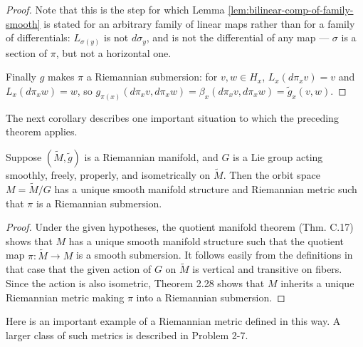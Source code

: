 \begin{proof}
Note that this is the step for which Lemma \ref{lem:bilinear-comp-of-family-smooth} is stated for an arbitrary family of linear maps rather than for a family of differentials: $L_{\sigma(y)}$ is not $d\sigma_y$, and is not the differential of any map --- $\sigma$ is a section of $\pi$, but not a horizontal one.

Finally $g$ makes $\pi$ a Riemannian submersion: for $v,w \in H_x$, $L_x(d\pi_x v) = v$ and $L_x(d\pi_x w) = w$, so $g_{\pi(x)}(d\pi_x v, d\pi_x w) = \beta_x(d\pi_x v, d\pi_x w) = \tilde{g}_x(v,w)$.
\end{proof}

The next corollary describes one important situation to which the preceding theorem applies.

\begin{corollary}
\label{cor:quotient-manifold-lie-group-riemannian-metric}
Suppose $(\tilde{M}, \tilde{g})$ is a Riemannian manifold, and $G$ is a Lie group acting smoothly, freely, properly, and isometrically on $\tilde{M}$. Then the orbit space $M = \tilde{M}/G$ has a unique smooth manifold structure and Riemannian metric such that $\pi$ is a Riemannian submersion.
\end{corollary}

\begin{proof}
Under the given hypotheses, the quotient manifold theorem (Thm. C.17) shows that $M$ has a unique smooth manifold structure such that the quotient map $\pi: \tilde{M} \to M$ is a smooth submersion. It follows easily from the definitions in that case that the given action of $G$ on $\tilde{M}$ is vertical and transitive on fibers. Since the action is also isometric, Theorem 2.28 shows that $M$ inherits a unique Riemannian metric making $\pi$ into a Riemannian submersion.
\end{proof}

Here is an important example of a Riemannian metric defined in this way. A larger class of such metrics is described in Problem 2-7.

